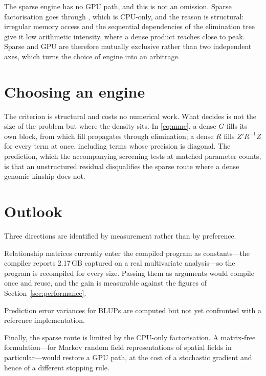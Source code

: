 \documentclass[article]{jss}
\begin{document}
The sparse engine has no GPU path, and this is not an omission. Sparse
factorisation goes through , which is CPU-only, and the reason is
structural: irregular memory access and the sequential dependencies of the
elimination tree give it low arithmetic intensity, where a dense product
reaches close to peak. Sparse and GPU are therefore mutually exclusive rather
than two independent axes, which turns the choice of engine into an arbitrage.

\section{Choosing an engine}\label{sec:decision}


The criterion is structural and costs no numerical work. What decides is not
the size of the problem but where the density sits. In \eqref{eq:mme}, a dense
$G$ fills its own block, from which fill propagates through elimination; a
dense $R$ fills $Z'R^{-1}Z$ for every term at once, including terms whose
precision is diagonal. The prediction, which the accompanying screening tests
at matched parameter counts, is that an unstructured residual disqualifies the
sparse route where a dense genomic kinship does not.

\section{Outlook}\label{sec:outlook}

Three directions are identified by measurement rather than by preference.

Relationship matrices currently enter the compiled program as constants---the
compiler reports 2.17\,GB captured on a real multivariate analysis---so the
program is recompiled for every size. Passing them as arguments would compile
once and reuse, and the gain is measurable against the figures of
Section~\ref{sec:performance}.

Prediction error variances for BLUPs are computed but not yet confronted with
a reference implementation.

Finally, the sparse route is limited by the CPU-only factorisation. A
matrix-free formulation---for Markov random field representations of spatial
fields in particular---would restore a GPU path, at the cost of a stochastic
gradient and hence of a different stopping rule.


\end{document}
